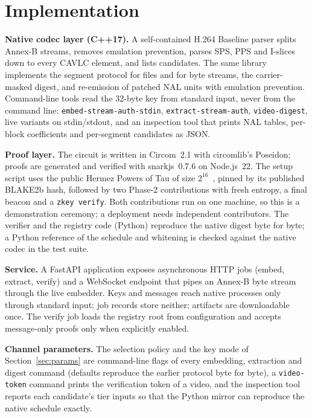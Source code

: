 \section{Implementation}
\label{sec:impl}

\textbf{Native codec layer (C++17).} A self-contained H.264 Baseline parser splits Annex-B streams, removes emulation prevention, parses SPS, PPS and I-slices down to every CAVLC element, and lists candidates. The same library implements the segment protocol for files and for byte streams, the carrier-masked digest, and re-emission of patched NAL units with emulation prevention. Command-line tools read the 32-byte key from standard input, never from the command line: \texttt{embed-stream-auth-stdin}, \texttt{extract-stream-auth}, \texttt{video-digest}, live variants on stdin/stdout, and an inspection tool that prints NAL tables, per-block coefficients and per-segment candidates as JSON.

\textbf{Proof layer.} The circuit is written in Circom~2.1 with circomlib's Poseidon; proofs are generated and verified with snarkjs~0.7.6 on Node.js~22. The setup script uses the public Hermez Powers of Tau of size $2^{16}$~\cite{hermez_ptau}, pinned by its published BLAKE2b hash, followed by two Phase-2 contributions with fresh entropy, a final beacon and a \texttt{zkey verify}. Both contributions run on one machine, so this is a demonstration ceremony; a deployment needs independent contributors. The verifier and the registry code (Python) reproduce the native digest byte for byte; a Python reference of the schedule and whitening is checked against the native codec in the test suite.

\textbf{Service.} A FastAPI application exposes asynchronous HTTP jobs (embed, extract, verify) and a WebSocket endpoint that pipes an Annex-B byte stream through the live embedder. Keys and messages reach native processes only through standard input; job records store neither; artifacts are downloadable once. The verify job loads the registry root from configuration and accepts message-only proofs only when explicitly enabled.

\textbf{Channel parameters.} The selection policy and the key mode of Section~\ref{sec:params} are command-line flags of every embedding, extraction and digest command (defaults reproduce the earlier protocol byte for byte), a \texttt{video-token} command prints the verification token of a video, and the inspection tool reports each candidate's tier inputs so that the Python mirror can reproduce the native schedule exactly.

